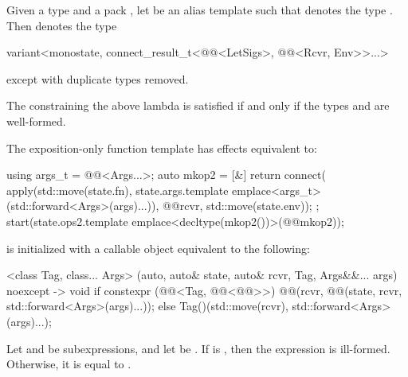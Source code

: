 \pnum
Given a type  and a pack ,
let  be an alias template
such that  denotes
the type .
Then  denotes
the type
\begin{codeblock}
variant<monostate, connect_result_t<@@<LetSigs>, @@<Rcvr, Env>>...>
\end{codeblock}
except with duplicate types removed.

\pnum
The  constraining the above lambda is satisfied
if and only if
the types  and  are well-formed.

\pnum
The exposition-only function template 
has effects equivalent to:
\begin{codeblock}
using args_t = @@<Args...>;
auto mkop2 = [&] {
  return connect(
    apply(std::move(state.fn),
          state.args.template emplace<args_t>(std::forward<Args>(args)...)),
    @@{rcvr, std::move(state.env)});
};
start(state.ops2.template emplace<decltype(mkop2())>(@@{mkop2}));
\end{codeblock}

\pnum
{}
is initialized with a callable object equivalent to the following:
\begin{codeblock}
[]<class Tag, class... Args>
  (auto, auto& state, auto& rcvr, Tag, Args&&... args) noexcept -> void {
    if constexpr (@@<Tag, @@<@@>>) {
      @@(rcvr, @@(state, rcvr, std::forward<Args>(args)...));
    } else {
      Tag()(std::move(rcvr), std::forward<Args>(args)...);
    }
  }
\end{codeblock}

\pnum
Let  and  be subexpressions, and
let  be .
If
is ,
then the expression 
is ill-formed.
Otherwise, it is equal to
.

